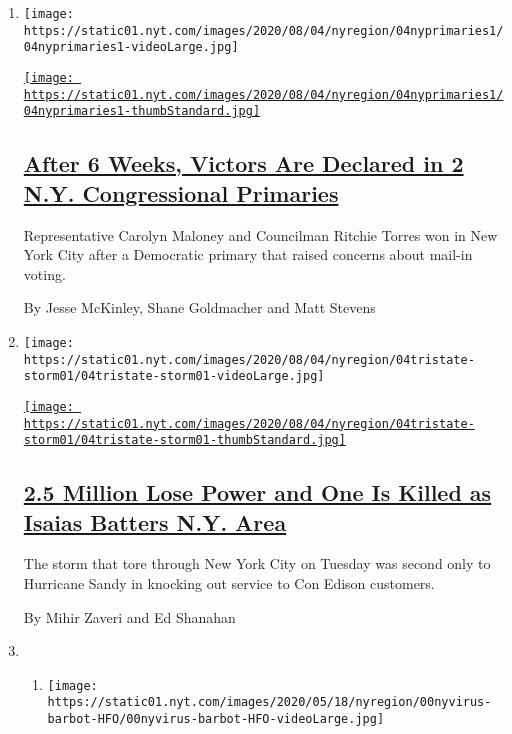 \begin{enumerate}
\def\labelenumi{\arabic{enumi}.}
\item
  \texttt{[image: https://static01.nyt.com/images/2020/08/04/nyregion/04nyprimaries1/04nyprimaries1-videoLarge.jpg]}

  \href{/2020/08/04/nyregion/maloney-torres-ny-congressional-races.html}{\texttt{[image: https://static01.nyt.com/images/2020/08/04/nyregion/04nyprimaries1/04nyprimaries1-thumbStandard.jpg]}}

  \hypertarget{after-6-weeks-victors-are-declared-in-2-ny-congressional-primaries}{%
  \subsection{\texorpdfstring{\href{/2020/08/04/nyregion/maloney-torres-ny-congressional-races.html}{After
  6 Weeks, Victors Are Declared in 2 N.Y. Congressional
  Primaries}}{After 6 Weeks, Victors Are Declared in 2 N.Y. Congressional Primaries}}\label{after-6-weeks-victors-are-declared-in-2-ny-congressional-primaries}}

  Representative Carolyn Maloney and Councilman Ritchie Torres won in
  New York City after a Democratic primary that raised concerns about
  mail-in voting.

  By Jesse McKinley, Shane Goldmacher and Matt Stevens
\item
  \texttt{[image: https://static01.nyt.com/images/2020/08/04/nyregion/04tristate-storm01/04tristate-storm01-videoLarge.jpg]}

  \href{/2020/08/04/nyregion/isaias-ny.html}{\texttt{[image: https://static01.nyt.com/images/2020/08/04/nyregion/04tristate-storm01/04tristate-storm01-thumbStandard.jpg]}}

  \hypertarget{25-million-lose-power-and-one-is-killed-as-isaias-batters-ny-area}{%
  \subsection{\texorpdfstring{\href{/2020/08/04/nyregion/isaias-ny.html}{2.5
  Million Lose Power and One Is Killed as Isaias Batters N.Y.
  Area}}{2.5 Million Lose Power and One Is Killed as Isaias Batters N.Y. Area}}\label{25-million-lose-power-and-one-is-killed-as-isaias-batters-ny-area}}

  The storm that tore through New York City on Tuesday was second only
  to Hurricane Sandy in knocking out service to Con Edison customers.

  By Mihir Zaveri and Ed Shanahan
\item
  \begin{enumerate}
  \def\labelenumii{\arabic{enumii}.}
  \item
    \texttt{[image: https://static01.nyt.com/images/2020/05/18/nyregion/00nyvirus-barbot-HFO/00nyvirus-barbot-HFO-videoLarge.jpg]}


\end{enumerate}
\end{enumerate}
